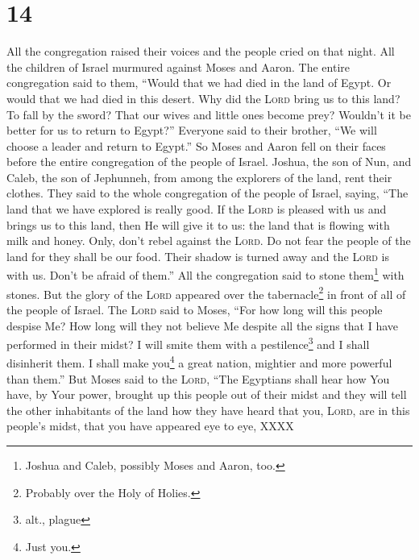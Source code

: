 \section{14}\label{Numbers 14}
\begin{enumerate}[align=center]
     All the congregation raised their voices and the people cried on that night.%
     All the children of Israel murmured against Moses and Aaron. The entire congregation said to them, ``Would that we had died in the land of Egypt. Or would that we had died in this desert.%
     Why did the \textsc{Lord} bring us to this land? To fall by the sword? That our wives and little ones become prey? Wouldn't it be better for us to return to Egypt?''%
     Everyone said to their brother, ``We will choose a leader and return to Egypt.''%
     So Moses and Aaron fell on their faces before the entire congregation of the people of Israel.%
     Joshua, the son of Nun, and Caleb, the son of Jephunneh, from among the explorers of the land, rent their clothes.%
     They said to the whole congregation of the people of Israel, saying, ``The land that we have explored is really good.%
     If the \textsc{Lord} is pleased with us and brings us to this land, then He will give it to us: the land that is flowing with milk and honey.%
     Only, don't rebel against the \textsc{Lord}. Do not fear the people of the land for they shall be our food. Their shadow is turned away and the \textsc{Lord} is with us. Don't be afraid of them.''%
     All the congregation said to stone them\footnote{Joshua and Caleb, possibly Moses and Aaron, too.} with stones. But the glory of the \textsc{Lord} appeared over the tabernacle\footnote{Probably over the Holy of Holies.} in front of all of the people of Israel.%
     The \textsc{Lord} said to Moses, ``For how long will this people despise Me? How long will they not believe Me despite all the signs that I have performed in their midst?%
     I will smite them with a pestilence\footnote{alt., plague} and I shall disinherit them. I shall make you\footnote{Just you.} a great nation, mightier and more powerful than them.''%
     But Moses said to the \textsc{Lord}, ``The Egyptians shall hear how You have, by Your power, brought up this people out of their midst%
     and they will tell the other inhabitants of the land how they have heard that you, \textsc{Lord}, are in this people's midst, that you have appeared eye to eye, XXXX%

\end{enumerate}
